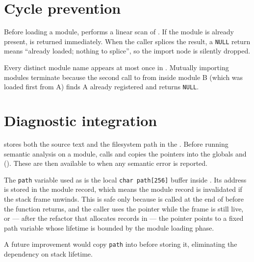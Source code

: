 \section{Cycle prevention}
\label{sec:mod-cycles}

\pnum
Before loading a module,  performs a linear
scan of .  If the module is already present, 
is returned immediately.  When the caller splices the result, a \texttt{NULL}
return means ``already loaded; nothing to splice'', so the import node is
silently dropped.

\begin{invariant}
Every distinct module name appears at most once in .
Mutually importing modules terminate because the second call to
 from inside module B (which was loaded first from A)
finds A already registered and returns \texttt{NULL}.
\end{invariant}

\section{Diagnostic integration}
\label{sec:mod-diagnostics}

\pnum
{} stores both the source text and the filesystem path in the
.  Before running semantic analysis on a module,
 calls  and
copies the pointers into the globals  and
 ().  These are then available
to  when any semantic error is reported.

\pnum
The \texttt{path} variable used as  is the local
\texttt{char path[256]} buffer inside .  Its address is
stored in the module record, which means the module record is invalidated if
the stack frame unwinds.  This is safe only because  is
called at the end of  before the function returns, and the
caller uses the pointer while the frame is still live, or — after the refactor
that allocates records in  — the pointer points to a fixed
path variable whose lifetime is bounded by the module loading phase.

\begin{note}
A future improvement would copy \texttt{path} into  before
storing it, eliminating the dependency on stack lifetime.
\end{note}
